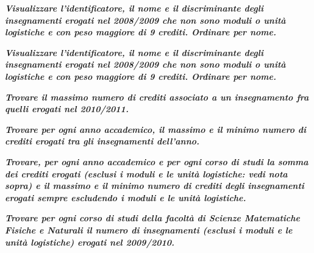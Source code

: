 \documentclass[a4paper]{article}
\begin{document}
	\noindent
	\:\newline

	\noindent
	\textcolor{Green4}{\textbf{\emph{Visualizzare l'identificatore, il nome e il discriminante degli insegnamenti erogati nel 2008/2009 che non sono moduli o unità logistiche e con peso maggiore di 9 crediti. Ordinare per nome.}}}\newline
	
	\noindent
	\:\newline

	\noindent
	\textcolor{Green4}{\textbf{\emph{Visualizzare l'identificatore, il nome e il discriminante degli insegnamenti erogati nel 2008/2009 che non sono moduli o unità logistiche e con peso maggiore di 9 crediti. Ordinare per nome.}}}\newline
	
	\noindent
	\:\newline

	\noindent
	\textcolor{Green4}{\textbf{\emph{Trovare il massimo numero di crediti associato a un insegnamento fra quelli erogati nel 2010/2011.}}}\newline
	
	\noindent
	\:\newline

	\noindent
	\textcolor{Green4}{\textbf{\emph{Trovare per ogni anno accademico, il massimo e il minimo numero di crediti erogati tra gli insegnamenti dell'anno.}}}\newline
	
	\noindent
	\:\newline

	\noindent
	\textcolor{Green4}{\textbf{\emph{Trovare, per ogni anno accademico e per ogni corso di studi la somma dei crediti erogati (esclusi i moduli e le unità logistiche: vedi nota sopra) e il massimo e il minimo numero di crediti degli insegnamenti erogati sempre escludendo i moduli e le unità logistiche.}}}\newline
	
	\noindent
	\:\newline

	\noindent
	\textcolor{Green4}{\textbf{\emph{Trovare per ogni corso di studi della facoltà di Scienze Matematiche Fisiche e Naturali il numero di insegnamenti (esclusi i moduli e le unità logistiche) erogati nel 2009/2010.}}}\newline
	
	\noindent
	\:\newline
\end{document}
